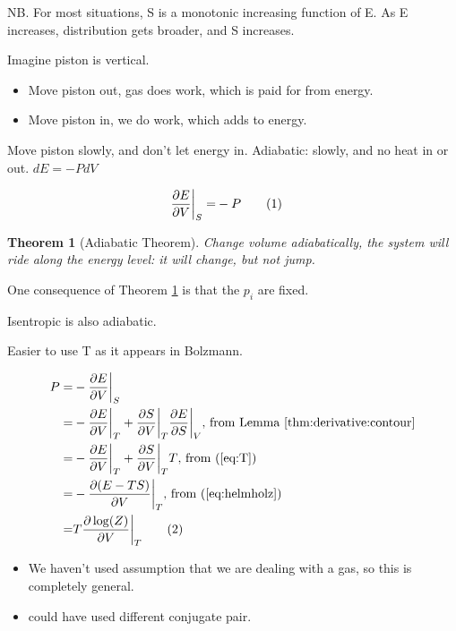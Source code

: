 \documentclass[]{article}
\newcommand\numberthis{\addtocounter{equation}{1}\tag{\theequation}}
\newtheorem{thm}{Theorem}
\begin{document}
NB. For most situations, S is a monotonic increasing function of E. As E increases, distribution gets broader, and S increases. 

Imagine piston is vertical.
\begin{itemize}
	\item Move piston out, gas does work, which is paid for from energy.
	\item Move piston in, we do work, which adds to energy.
\end{itemize}

Move piston slowly, and don't let energy in. Adiabatic: slowly, and no heat in or out. $dE = - P dV$

\begin{align*}
\frac{\partial E}{\partial V}\bigg|_S =& - P\numberthis \label{eq:defP}
\end{align*}


\begin{thm}[Adiabatic Theorem]\label{thm:adiabatic}
	Change volume adiabatically, the system will ride along the energy level: it will change, but not jump.
\end{thm}

One consequence of Theorem \ref{thm:adiabatic} is that the $p_i$ are fixed.

Isentropic is also adiabatic.

Easier to use T as it appears in Bolzmann.

\begin{align*}
P =& - \frac{\partial E}{\partial V}\bigg|_S \\
=& - \frac{\partial E}{\partial V}\bigg|_T + \frac{\partial S}{\partial V}\bigg|_T \frac{\partial E}{\partial S}\bigg|_V\text{, from Lemma \ref{thm:derivative:contour}}\\
=& - \frac{\partial E}{\partial V}\bigg|_T + \frac{\partial S}{\partial V}\bigg|_T T\text{, from (\ref{eq:T})}\\
=& - \frac{\partial(E-TS)}{\partial V}\bigg|_T \text{, from (\ref{eq:helmholz})}\\
=& T \frac{\partial \log(Z)}{\partial V}\bigg|_T \numberthis \label{eq:P_Z_V}
\end{align*}

\begin{itemize}
	\item We haven't used assumption that we are dealing with a gas, so this is completely general.
	\item could have used different conjugate pair.
\end{itemize}
\end{document}
